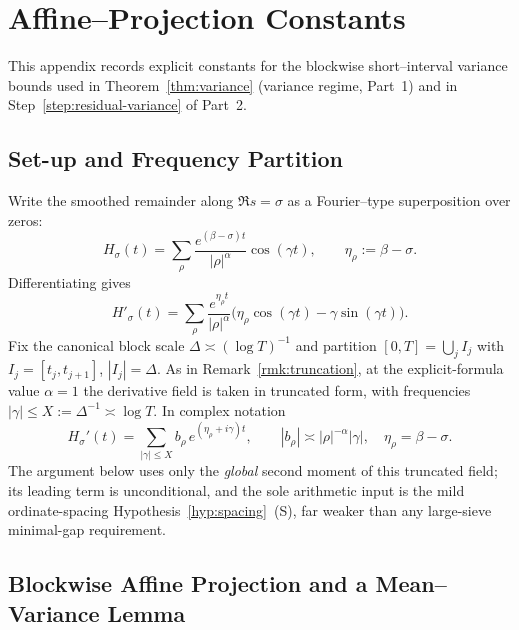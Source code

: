 
\section{Affine–Projection Constants}
\label{app:A}

This appendix records explicit constants for the blockwise
short–interval variance bounds used in
Theorem~\ref{thm:variance} (variance regime, Part~1) and in
Step~\ref{step:residual-variance} of Part~2.

\subsection{Set-up and Frequency Partition}

Write the smoothed remainder along $\Re s=\sigma$ as a Fourier–type
superposition over zeros:
\[
H_\sigma(t)=\sum_{\rho}\frac{e^{(\beta-\sigma)t}}{|\rho|^{\alpha}}\cos(\gamma t),
\qquad
\eta_\rho:=\beta-\sigma .
\]
Differentiating gives
\[
H'_\sigma(t)=\sum_{\rho}\frac{e^{\eta_\rho t}}{|\rho|^{\alpha}}
\bigl(\eta_\rho\cos(\gamma t)-\gamma\sin(\gamma t)\bigr).
\]
Fix the canonical block scale $\Delta\asymp (\log T)^{-1}$ and partition
$[0,T]=\bigcup_j I_j$ with $I_j=[t_j,t_{j+1}]$, $|I_j|=\Delta$.
As in Remark~\ref{rmk:truncation}, at the explicit-formula value $\alpha=1$ the
derivative field is taken in truncated form, with frequencies
$|\gamma|\le X:=\Delta^{-1}\asymp\log T$.  In complex notation
\[
H_\sigma'(t)=\sum_{|\gamma|\le X} b_\rho\, e^{(\eta_\rho+i\gamma)t},
\qquad |b_\rho|\asymp |\rho|^{-\alpha}|\gamma|,\quad \eta_\rho=\beta-\sigma .
\]
The argument below uses only the \emph{global} second moment of this truncated
field; its leading term is unconditional, and the sole arithmetic input is the
mild ordinate-spacing Hypothesis~\ref{hyp:spacing}~(S), far weaker than any
large-sieve minimal-gap requirement.

\subsection{Blockwise Affine Projection and a Mean–Variance Lemma}

